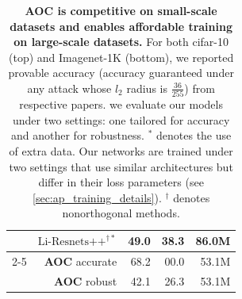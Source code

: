 \begin{table}[ht]
\begin{tabular}{crrrr}
          & $\text{Li-Resnets++}^{\dagger*}$ &   49.0 &   38.3 &     86.0M \\
        \cline{2-5}
          & \textbf{AOC} \small{accurate} &   68.2 &   00.0 &     53.1M \\
          & \textbf{AOC} \small{robust} &   42.1 &   26.3 &     53.1M \\
        \bottomrule
        \end{tabular}
    \caption{\textbf{AOC is competitive on small-scale datasets and enables affordable training on large-scale datasets.} For both cifar-10 (top) and Imagenet-1K (bottom), we reported provable accuracy (accuracy guaranteed under any attack whose $l_2$ radius is $\frac{36}{255}$) from respective papers.
    we evaluate our models under two settings: one tailored for accuracy and another for robustness. $^*$ denotes the use of extra data.%
    Our networks are trained under two settings that use similar architectures but differ in their loss parameters (see \cref{sec:ap_training_details}).%
    $^\dagger$ denotes nonorthogonal methods.
    }
    \label{tab:robust_cifar10}
\end{table}

